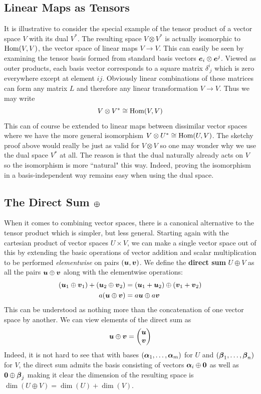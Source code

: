 \documentclass[onecolumn]{gwclass}
\begin{document}
	\subsection{Linear Maps as Tensors}
	It is illustrative to consider the special example of the tensor product of a vector space $V$ with its dual $V^*$. The resulting space $V\otimes V^*$ is actually isomorphic to $\text{\normalfont{Hom}}(V,V)$, the vector space of linear maps $V\to V$. This can easily be seen by examining the tensor basis formed from standard basis vectors $\boldsymbol{e}_i\otimes\boldsymbol{e}^j$. Viewed as outer products, each basis vector corresponds to a square matrix $\delta^i_{\;j}$ which is zero everywhere except at element $ij$. Obviously linear combinations of these matrices can form any matrix $L$ and therefore any linear transformation $V\to V$. Thus we may write
	$$ V\otimes V^*  \cong \text{\normalfont{Hom}}(V,V)$$
	This can of course be extended to linear maps between dissimilar vector spaces where we have the more general isomorphism $V\otimes U^*\cong \text{\normalfont{Hom}}(U,V)$. The sketchy proof above would really be just as valid for $V\otimes V$ so one may wonder why we use the dual space $V^*$ at all. The reason is that the dual naturally already acts on $V$ so the isomorphism is more ``natural" this way. Indeed, proving the isomorphism in a basis-independent way remains easy when using the dual space.
	
	\subsection{The Direct Sum $\boldsymbol{\oplus}$}
	
	When it comes to combining vector spaces, there is a canonical alternative to the tensor product which is simpler, but less general. Starting again with the cartesian product of vector spaces $U\times V$, we can make a single vector space out of this by extending the basic operations of vector addition and scalar multiplication to be performed \emph{elementwise} on pairs $(\boldsymbol{u},\boldsymbol{v})$. We define the \textbf{direct sum} $U\oplus V$ as all the pairs $\boldsymbol{u}\oplus\boldsymbol{v}$ along with the elementwise operations:
	\begin{align*}
		(\boldsymbol{u}_1\oplus\boldsymbol{v}_1) + (\boldsymbol{u}_2\oplus\boldsymbol{v}_2) &= (\boldsymbol{u}_1+\boldsymbol{u}_2)\oplus( \boldsymbol{v}_1+\boldsymbol{v}_2)\\
		a(\boldsymbol{u}\oplus\boldsymbol{v}) &= a\boldsymbol{u} \oplus a\boldsymbol{v}
	\end{align*}
	This can be understood as nothing more than the concatenation of one vector space by another. We can view elements of the direct sum as
	$$ \boldsymbol{u}\oplus\boldsymbol{v} = \begin{pmatrix}
		\boldsymbol{u} \\
		\boldsymbol{v}
	\end{pmatrix} $$
	Indeed, it is not hard to see that with bases $(\boldsymbol{\alpha}_1,\dots,\boldsymbol{\alpha}_m)$ for $U$ and $(\boldsymbol{\beta}_1,\dots,\boldsymbol{\beta}_n)$ for $V$, the direct sum admits the basis consisting of vectors $\boldsymbol{\alpha}_i\oplus\boldsymbol{0}$ as well as $\boldsymbol{0}\oplus\boldsymbol{\beta}_j$ making it clear the dimension of the resulting space is $ \dim(U\oplus V) = \dim(U) + \dim(V) $.
	
\end{document}
